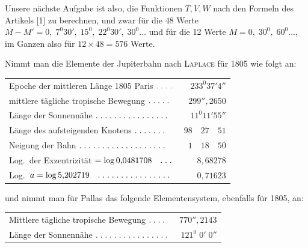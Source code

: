 \begin{landscape}
\par\noindent\hspace*{\parindent}Unsere nächste Aufgabe ist also, die Funktionen \(T,V,W\) nach den Formeln des Artikels [1] zu berechnen, und zwar für die 48 Werte \(M-M'=0,\;7^0 30',\;15^0,\;22^0 30',\;30^0\ldots\) und für die 12 Werte \(M=0,\;30^0,\;60^0\ldots\), im Ganzen also für \(12\times48=576\) Werte.
\par\noindent\edef\VSixSavedIndent{\the\parindent}\begin{minipage}{\linewidth}\setlength{\parindent}{\VSixSavedIndent}
\par\noindent\hspace*{\parindent}Nimmt man die Elemente der Jupiterbahn nach \textsc{Laplace} für 1805 wie folgt an:
\begin{center}
\begin{tabular}{@{}l@{\quad}r@{}}
Epoche der mittleren Länge 1805 Paris \(\VSixPoint\VSixPoint\VSixPoint\VSixPoint\)&\(233^0 37'4''\)\\
mittlere tägliche tropische Bewegung \(\VSixPoint\VSixPoint\VSixPoint\VSixPoint\VSixPoint\)&\(299''{,}2650\)\\
Länge der Sonnennähe \(\VSixTenPoints\VSixPoint\VSixPoint\VSixPoint\VSixPoint\VSixPoint\VSixPoint\)&\(11^0 11'55''\)\\
Länge des aufsteigenden Knotens \(\VSixPoint\VSixPoint\VSixPoint\VSixPoint\VSixPoint\VSixPoint\VSixPoint\)&\(98\quad27\quad51\)\\
Neigung der Bahn \(\VSixTenPoints\VSixPoint\VSixPoint\VSixPoint\VSixPoint\VSixPoint\VSixPoint\VSixPoint\VSixPoint\VSixPoint\)&\(1\quad18\quad50\)\\
Log.\ der Exzentrizität \(=\log0{,}0481708\quad\VSixPoint\VSixPoint\VSixPoint\)&\(8{,}68278\)\\
Log.\ \(a=\log5{,}202719\quad\VSixTenPoints\VSixPoint\VSixPoint\VSixPoint\VSixPoint\VSixPoint\VSixPoint\)&\(0{,}71623\)
\end{tabular}
\end{center}
\end{minipage}\par
\noindent und nimmt man für Pallas das folgende Elementensystem, ebenfalls für 1805, an:
\begin{center}
\begin{tabular}{@{}l@{\quad}r@{}}
Mittlere tägliche tropische Bewegung \(\VSixPoint\VSixPoint\VSixPoint\VSixPoint\)&\(770''{,}2143\)\\
Länge der Sonnennähe \(\VSixTenPoints\VSixPoint\VSixPoint\VSixPoint\VSixPoint\VSixPoint\VSixPoint\)&\(121^0\;0'\;0''\)\\

\end{tabular}
\end{center}
\end{landscape}
